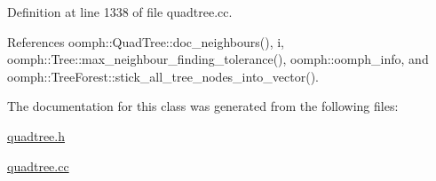 Definition at line 1338 of file quadtree.\+cc.



References oomph\+::\+Quad\+Tree\+::doc\+\_\+neighbours(), i, oomph\+::\+Tree\+::max\+\_\+neighbour\+\_\+finding\+\_\+tolerance(), oomph\+::oomph\+\_\+info, and oomph\+::\+Tree\+Forest\+::stick\+\_\+all\+\_\+tree\+\_\+nodes\+\_\+into\+\_\+vector().



The documentation for this class was generated from the following files\+:\begin{DoxyCompactItemize}
\item 
\hyperlink{quadtree_8h}{quadtree.\+h}\item 
\hyperlink{quadtree_8cc}{quadtree.\+cc}\end{DoxyCompactItemize}
